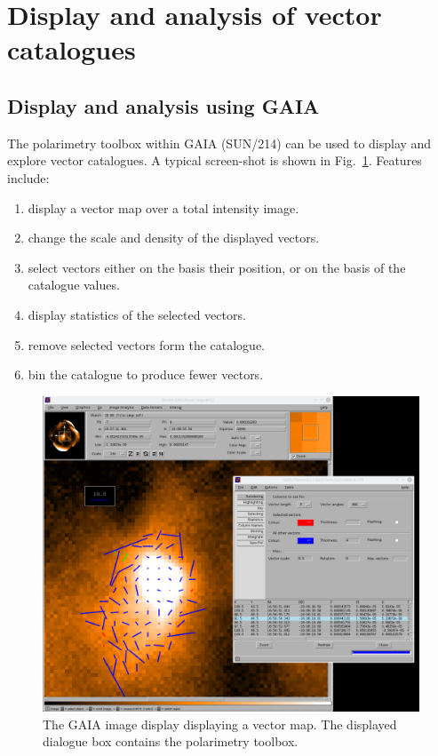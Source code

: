 \documentclass[twoside,11pt]{starlink}
\begin{document}
\section{Display and analysis of vector catalogues}

\subsection{Display and analysis using GAIA}

The polarimetry toolbox within GAIA (SUN/214) can be used to display and
explore vector catalogues. A typical screen-shot is shown in
Fig.~\ref{fig:gaia}. Features include:

\begin{enumerate}
\item display a vector map over a total intensity image.
\item change the scale and density of the displayed vectors.
\item select vectors either on the basis their position, or on the basis
of the catalogue values.
\item display statistics of the selected vectors.
\item remove selected vectors form the catalogue.
\item bin the catalogue to produce fewer vectors.
\end{enumerate}

\begin{figure}
\includegraphics[width=\columnwidth]{gaia}
\caption{The GAIA image display displaying a vector map. The displayed
dialogue box contains the polarimetry toolbox.}
\label{fig:gaia}
\end{figure}
\end{document}
